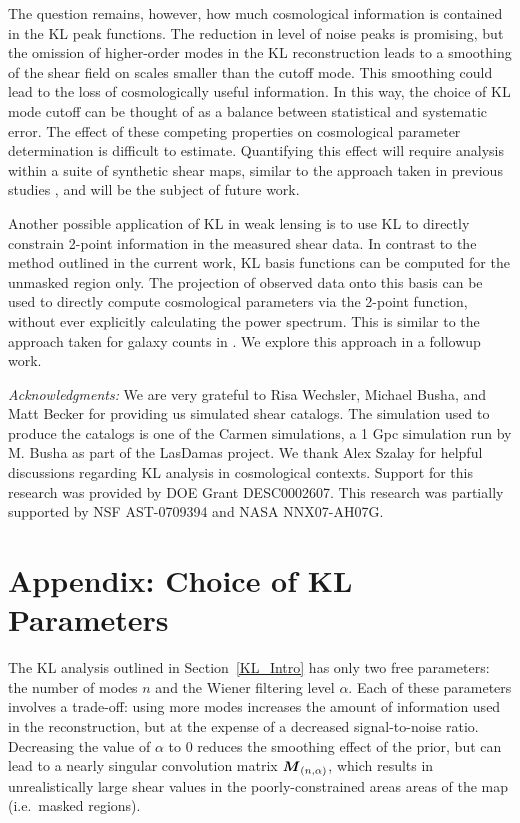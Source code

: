 The question remains, however, how much cosmological information is contained
in the KL peak functions.  The reduction in level of noise peaks is promising,
but the omission of higher-order modes in the KL reconstruction leads to 
a smoothing of the shear field on scales smaller than the cutoff mode.
This smoothing could lead to the loss of cosmologically useful information.
In this way, the choice of KL mode cutoff can be thought of as a balance 
between statistical and systematic error.
The effect of these competing properties on cosmological
parameter determination is difficult to estimate.  Quantifying this effect
will require analysis within a suite of synthetic shear maps, similar to the
approach taken in previous studies \citep[e.g.][]{Dietrich10,Kratochvil10}, 
and will be the subject of future work.

Another possible application of KL in weak lensing is to use KL to 
directly constrain 2-point information in the measured shear data.  
In contrast to the method outlined in the current work, 
KL basis functions can be computed for the unmasked region only.
The projection of observed data onto this basis can be used to 
directly compute cosmological parameters via the 2-point function, 
without ever explicitly calculating the power spectrum.  
This is similar to the approach taken for galaxy counts
in \citet{Vogeley96}.  We explore this approach in a followup work.
 
{\it Acknowledgments:} 
We are very grateful to Risa Wechsler, Michael Busha, and Matt Becker for 
providing us simulated shear catalogs.  The simulation used to produce the 
catalogs is one of the Carmen simulations, a 1 Gpc simulation run by M. Busha 
as part of the LasDamas project. 
We thank Alex Szalay for helpful discussions regarding KL analysis in 
cosmological contexts.
Support for this research was provided by DOE Grant DESC0002607.
This research was partially supported by NSF AST-0709394 and NASA NNX07-AH07G.


\section{Appendix: Choice of KL Parameters}
\label{Choosing_Params}
The KL analysis outlined in Section~\ref{KL_Intro}
has only two free parameters: the number of
modes $n$ and the Wiener filtering level $\alpha$.  Each of these parameters
involves a trade-off: using more modes increases the amount of information
used in the reconstruction, but at the expense of a decreased signal-to-noise
ratio.  Decreasing the value of $\alpha$ to $0$ reduces the smoothing effect 
of the prior, but can lead to a nearly singular convolution matrix 
$\boldsymbol{M}_{(n,\alpha)}$, 
which results in unrealistically large shear values in the poorly-constrained 
areas areas of the map (i.e.~masked regions).


